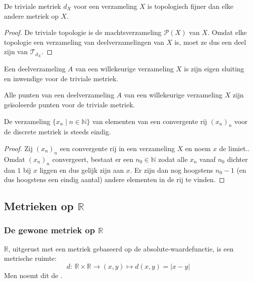 \documentclass[main.tex]{subfiles}
\begin{document}
\begin{st}
  De triviale metriek $d_{X}$ voor een verzameling $X$ is topologisch fijner dan elke andere metriek op $X$.

  \begin{proof}
    De triviale topologie is de machtsverzameling $\mathcal{P}(X)$ van $X$.
    Omdat elke topologie een verzameling van deelverzamelingen van $X$ is, moet ze dus een deel zijn van $\mathcal{T}_{d_{X}}$.
  \end{proof}
\end{st}

\begin{st}
  Een deelverzameling $A$ van een willekeurige verzameling $X$ is zijn eigen sluiting en inwendige voor de triviale metriek.
\end{st}

\begin{st}
  Alle punten van een deelverzameling $A$ van een willekeurige verzameling $X$ zijn ge\"isoleerde punten voor de triviale metriek.
\end{st}

\begin{st}
  De verzameling $\{ x_{n} \mid n\in \mathbb{N} \}$ van elementen van een convergente rij $(x_{n})_{n}$ voor de discrete metriek is steeds eindig.

  \begin{proof}
    Zij $(x_{n})_{n}$ een convergente rij in een verzameling $X$ en noem $x$ de limiet..
    Omdat $(x_{n})_{n}$ convergeert, bestaat er een $n_{0}\in \mathbb{N}$ zodat alle $x_{n}$ vanaf $n_{0}$ dichter dan $1$ bij $x$ liggen en dus gelijk zijn aan $x$.
    Er zijn dan nog hoogstens $n_{0}-1$ (en dus hoogstens een eindig aantal) andere elementen in de rij te vinden.
  \end{proof}
\end{st}

\subsection{Metrieken op $\mathbb{R}$}
\label{sec:metrieken-op-mathbbr}

\subsubsection{De gewone metriek op $\mathbb{R}$}
\label{sec:de-gewone-metriek}

\begin{vb}
  $\mathbb{R}$, uitgerust met een metriek gebaseerd op de absolute-waardefunctie, is een metrische ruimte:
  \[ d:\ \mathbb{R}\times\mathbb{R}\rightarrow (x,y) \mapsto d(x,y)=|x-y| \]
  Men noemt dit de .
\end{vb}
\end{document}
